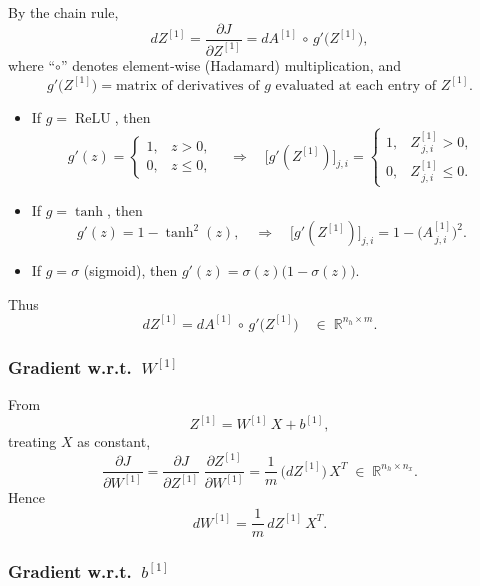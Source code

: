 \documentclass{article}
\begin{document}
By the chain rule,
\begin{equation}\label{eq:dZ1}
  dZ^{[1]}
    = \frac{\partial J}{\partial Z^{[1]}}
    = dA^{[1]} \,\circ\, g'\bigl(Z^{[1]}\bigr),
\end{equation}
where “\(\circ\)” denotes element‐wise (Hadamard) multiplication, and
\[
  g'\bigl(Z^{[1]}\bigr)
  = \text{matrix of derivatives of \(g\) evaluated at each entry of }Z^{[1]}.
\]
\begin{itemize}
  \item If $g = \operatorname{ReLU}$, then
  \[
    g'(z) = 
    \begin{cases}
      1, & z > 0,\\
      0, & z \le 0,
    \end{cases}
    \quad\Longrightarrow\quad
    \bigl[g'(Z^{[1]})\bigr]_{j,i} 
      = 
      \begin{cases}
        1, & Z^{[1]}_{\,j,i} > 0,\\
        0, & Z^{[1]}_{\,j,i} \le 0.
      \end{cases}
  \]
  \item If $g = \tanh$, then
  \[
    g'(z) = 1 - \tanh^2(z), 
    \quad\Longrightarrow\quad
    \bigl[g'(Z^{[1]})\bigr]_{j,i}
      = 1 - \bigl(A^{[1]}_{\,j,i}\bigr)^2.
  \]
  \item If $g = \sigma$ (sigmoid), then $g'(z) = \sigma(z)\bigl(1 - \sigma(z)\bigr)$.
\end{itemize}

Thus 
\[
  dZ^{[1]} = dA^{[1]} \,\circ\, g'\bigl(Z^{[1]}\bigr)
  \quad\in\; \mathbb{R}^{n_h \times m}.
\]

\subsubsection{Gradient w.r.t.\ \(W^{[1]}\)}

From
\[
  Z^{[1]} = W^{[1]}\,X + b^{[1]},
\]
treating $X$ as constant,
\[
  \frac{\partial J}{\partial W^{[1]}}
    = \frac{\partial J}{\partial Z^{[1]}}
      \;\frac{\partial Z^{[1]}}{\partial W^{[1]}}
    = \frac{1}{m}\,\bigl(dZ^{[1]}\bigr)\,X^{T}
    \;\in\; \mathbb{R}^{n_h \times n_x}.
\]
Hence
\begin{equation}\label{eq:dW1}
  dW^{[1]} = \frac{1}{m}\,dZ^{[1]}\,X^{T}.
\end{equation}

\subsubsection{Gradient w.r.t.\ \(b^{[1]}\)}
\end{document}

